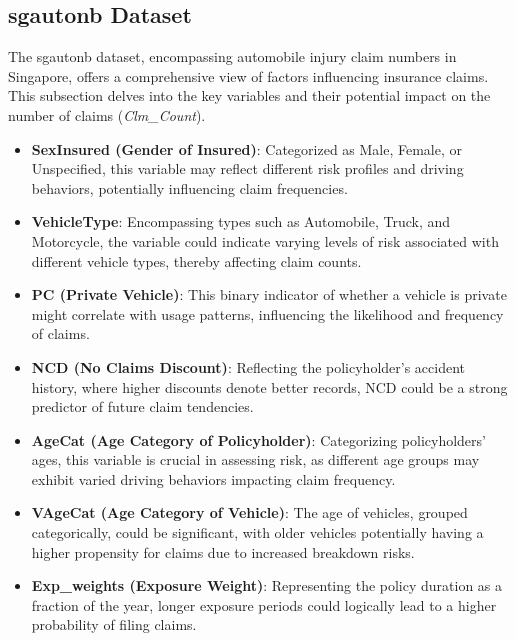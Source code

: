\documentclass[12pt, twoside,hidelinks]{article}
\theoremstyle{definition}
\numberwithin{equation}{section}
\begin{document}
\newpage

\subsection{sgautonb Dataset}
The sgautonb dataset, encompassing automobile injury claim numbers in Singapore, offers a comprehensive view of factors influencing insurance claims. This subsection delves into the key variables and their potential impact on the number of claims (\textit{Clm\_Count}).

\begin{itemize}
    \item \textbf{SexInsured (Gender of Insured)}: Categorized as Male, Female, or Unspecified, this variable may reflect different risk profiles and driving behaviors, potentially influencing claim frequencies.
    
    \item \textbf{VehicleType}: Encompassing types such as Automobile, Truck, and Motorcycle, the variable could indicate varying levels of risk associated with different vehicle types, thereby affecting claim counts.
    
    \item \textbf{PC (Private Vehicle)}: This binary indicator of whether a vehicle is private might correlate with usage patterns, influencing the likelihood and frequency of claims.
    
    \item \textbf{NCD (No Claims Discount)}: Reflecting the policyholder's accident history, where higher discounts denote better records, NCD could be a strong predictor of future claim tendencies.
    
    \item \textbf{AgeCat (Age Category of Policyholder)}: Categorizing policyholders' ages, this variable is crucial in assessing risk, as different age groups may exhibit varied driving behaviors impacting claim frequency.
    
    \item \textbf{VAgeCat (Age Category of Vehicle)}: The age of vehicles, grouped categorically, could be significant, with older vehicles potentially having a higher propensity for claims due to increased breakdown risks.
    
    \item \textbf{Exp\_weights (Exposure Weight)}: Representing the policy duration as a fraction of the year, longer exposure periods could logically lead to a higher probability of filing claims.
\end{itemize}
\end{document}
